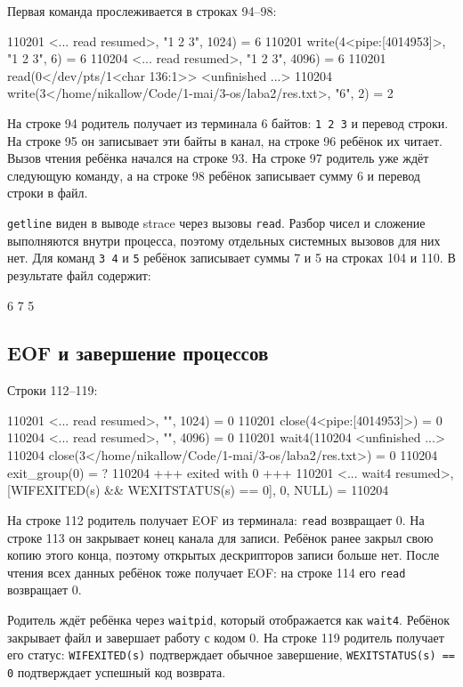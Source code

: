\documentclass[12pt,a4paper]{article}
\begin{document}
Первая команда прослеживается в строках 94--98:
\begin{terminal}
110201 <... read resumed>, "1 2 3\n", 1024) = 6
110201 write(4<pipe:[4014953]>, "1 2 3\n", 6) = 6
110204 <... read resumed>, "1 2 3\n", 4096) = 6
110201 read(0</dev/pts/1<char 136:1>> <unfinished ...>
110204 write(3</home/nikallow/Code/1-mai/3-os/laba2/res.txt>, "6\n", 2) = 2
\end{terminal}

На строке 94 родитель получает из терминала 6 байтов: \texttt{1 2 3} и перевод строки. На строке 95 он записывает эти байты в канал, на строке 96 ребёнок их читает. Вызов чтения ребёнка начался на строке 93. На строке 97 родитель уже ждёт следующую команду, а на строке 98 ребёнок записывает сумму 6 и перевод строки в файл.

\texttt{getline} виден в выводе strace через вызовы \texttt{read}. Разбор чисел и сложение выполняются внутри процесса, поэтому отдельных системных вызовов для них нет. Для команд \texttt{3 4} и \texttt{5} ребёнок записывает суммы 7 и 5 на строках 104 и 110. В результате файл содержит:
\begin{terminal}
6
7
5
\end{terminal}

\subsection{EOF и завершение процессов}
Строки 112--119:
\begin{terminal}
110201 <... read resumed>, "", 1024)    = 0
110201 close(4<pipe:[4014953]>)         = 0
110204 <... read resumed>, "", 4096)    = 0
110201 wait4(110204 <unfinished ...>
110204 close(3</home/nikallow/Code/1-mai/3-os/laba2/res.txt>) = 0
110204 exit_group(0)                    = ?
110204 +++ exited with 0 +++
110201 <... wait4 resumed>, [{WIFEXITED(s) && WEXITSTATUS(s) == 0}], 0, NULL) = 110204
\end{terminal}

На строке 112 родитель получает EOF из терминала: \texttt{read} возвращает 0. На строке 113 он закрывает конец канала для записи. Ребёнок ранее закрыл свою копию этого конца, поэтому открытых дескрипторов записи больше нет. После чтения всех данных ребёнок тоже получает EOF: на строке 114 его \texttt{read} возвращает 0.

Родитель ждёт ребёнка через \texttt{waitpid}, который отображается как \texttt{wait4}. Ребёнок закрывает файл и завершает работу с кодом 0. На строке 119 родитель получает его статус: \texttt{WIFEXITED(s)} подтверждает обычное завершение, \texttt{WEXITSTATUS(s) == 0} подтверждает успешный код возврата.
\end{document}
